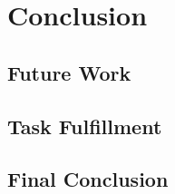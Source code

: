 \chapter{Conclusion}
\label{chp:conclusion} 

\section{Future Work}

\section{Task Fulfillment}

\section{Final Conclusion}